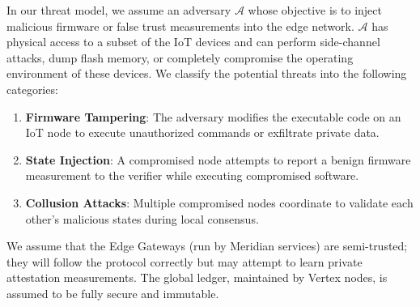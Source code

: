 In our threat model, we assume an adversary $\mathcal{A}$ whose objective is to inject malicious firmware or false trust measurements into the edge network. $\mathcal{A}$ has physical access to a subset of the IoT devices and can perform side-channel attacks, dump flash memory, or completely compromise the operating environment of these devices. We classify the potential threats into the following categories:
\begin{enumerate}
    \item \textbf{Firmware Tampering}: The adversary modifies the executable code on an IoT node to execute unauthorized commands or exfiltrate private data.
    \item \textbf{State Injection}: A compromised node attempts to report a benign firmware measurement to the verifier while executing compromised software.
    \item \textbf{Collusion Attacks}: Multiple compromised nodes coordinate to validate each other's malicious states during local consensus.
\end{enumerate}

We assume that the Edge Gateways (run by Meridian services) are semi-trusted; they will follow the protocol correctly but may attempt to learn private attestation measurements. The global ledger, maintained by Vertex nodes, is assumed to be fully secure and immutable.
